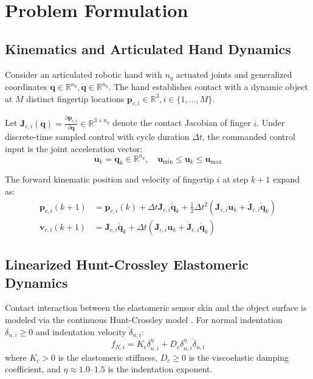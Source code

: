 \section{Problem Formulation}
\label{sec:problem_formulation}

\subsection{Kinematics and Articulated Hand Dynamics}
Consider an articulated robotic hand with $n_q$ actuated joints and generalized coordinates $\mathbf{q} \in \mathbb{R}^{n_q}, \dot{\mathbf{q}} \in \mathbb{R}^{n_q}$. The hand establishes contact with a dynamic object at $M$ distinct fingertip locations $\mathbf{p}_{c, i} \in \mathbb{R}^3, i \in \{1, \dots, M\}$.

Let $\mathbf{J}_{c, i}(\mathbf{q}) = \frac{\partial \mathbf{p}_{c, i}}{\partial \mathbf{q}} \in \mathbb{R}^{3 \times n_q}$ denote the contact Jacobian of finger $i$. Under discrete-time sampled control with cycle duration $\Delta t$, the commanded control input is the joint acceleration vector:
\begin{equation}
    \mathbf{u}_k = \ddot{\mathbf{q}}_k \in \mathbb{R}^{n_q}, \quad \mathbf{u}_{\min} \le \mathbf{u}_k \le \mathbf{u}_{\max}
    \label{eq:joint_accel_bounds}
\end{equation}

The forward kinematic position and velocity of fingertip $i$ at step $k+1$ expand as:
\begin{align}
    \mathbf{p}_{c, i}(k+1) &= \mathbf{p}_{c, i}(k) + \Delta t \mathbf{J}_{c, i} \dot{\mathbf{q}}_k + \frac{1}{2} \Delta t^2 \left( \mathbf{J}_{c, i} \mathbf{u}_k + \dot{\mathbf{J}}_{c, i} \dot{\mathbf{q}}_k \right) \label{eq:pos_update} \\
    \mathbf{v}_{c, i}(k+1) &= \mathbf{J}_{c, i} \dot{\mathbf{q}}_k + \Delta t \left( \mathbf{J}_{c, i} \mathbf{u}_k + \dot{\mathbf{J}}_{c, i} \dot{\mathbf{q}}_k \right) \label{eq:vel_update}
\end{align}

\subsection{Linearized Hunt-Crossley Elastomeric Dynamics}
Contact interaction between the elastomeric sensor skin and the object surface is modeled via the continuous Hunt-Crossley model \cite{hunt1975coefficient}. For normal indentation $\delta_{n, i} \ge 0$ and indentation velocity $\dot{\delta}_{n, i}$:
\begin{equation}
    f_{N, i} = K_c \delta_{n, i}^{\eta} + D_c \delta_{n, i}^{\eta} \dot{\delta}_{n, i}
    \label{eq:hunt_crossley}
\end{equation}
where $K_c > 0$ is the elastomeric stiffness, $D_c \ge 0$ is the viscoelastic damping coefficient, and $\eta \approx 1.0\text{--}1.5$ is the indentation exponent.

